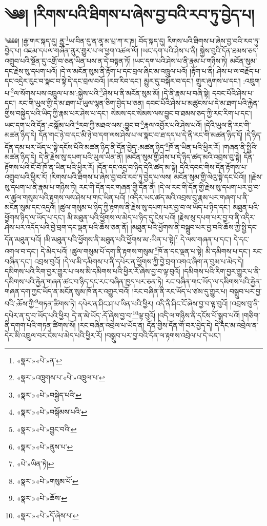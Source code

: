 \chapter{༄༅། །རིགས་པའི་ཐིགས་པ་ཞེས་བྱ་བའི་རབ་ཏུ་བྱེད་པ།}༄༅༅། །རྒྱ་གར་སྐད་དུ། ནྱཱ་\footnote{«སྣར་»«པེ་»ན་}ཡ་བིན་དུ་ན་ནཱ་མ་པྲ་ཀ་ར་ཎ། བོད་སྐད་དུ། རིགས་པའི་ཐིགས་པ་ཞེས་བྱ་བའི་རབ་ཏུ་བྱེད་པ། འཇམ་དཔལ་གཞོན་ནུར་གྱུར་པ་ལ་ཕྱག་འཚལ་ལོ། །ཡང་དག་པའི་ཤེས་པ་ནི། སྐྱེས་བུའི་དོན་ཐམས་ཅད་འགྲུབ་པའི་སྔོན་དུ་འགྲོ་བ་ཅན་ཡིན་པས་ན་དེ་བསྟན་ཏོ། །ཡང་དག་པའི་ཤེས་པ་ནི་རྣམ་པ་གཉིས་ཏེ། མངོན་སུམ་དང་རྗེས་སུ་དཔག་པའོ། །དེ་ལ་མངོན་སུམ་ནི་རྟོག་པ་དང་བྲལ་ཞིང་མ་འཁྲུལ་པའོ། །རྟོག་པ་ནི། ཤེས་པ་ལ་བརྗོད་པ་དང་འདྲེར་རུང་བ་སྣང་བ་སྟེ་དེ་དང་བྲལ་བའོ། །རབ་རིབ་དང་། མྱུར་དུ་བསྐོར་བ་དང་། གྲུར་ཞུགས་པ་དང་། :འཁྲུག་པ་\footnote{«སྣར་»འཁྲུགས་པ་«པེ་»འཁྲུལ་པ་}ལ་སོགས་པས་འཁྲུལ་པ་མ་:སྐྱེས་པའི་\footnote{«སྣར་»«པེ་»བསྐྱེད་པའི་}ཤེས་པ་ནི་མངོན་སུམ་མོ། །དེ་ནི་རྣམ་པ་བཞི་སྟེ། དབང་པོའི་ཤེས་པ་དང་། རང་གི་ཡུལ་གྱི་དེ་མ་ཐག་པ་ཡུལ་ལྷན་ཅིག་བྱེད་པ་ཅན། དབང་པོའི་ཤེས་པ་མཚུངས་པ་དེ་མ་ཐག་པའི་རྐྱེན་གྱིས་བསྐྱེད་པའི་ཡིད་ཀྱི་རྣམ་པར་ཤེས་པ་དང་། སེམས་དང་སེམས་ལས་བྱུང་བ་ཐམས་ཅད་ཀྱི་རང་རིག་པ་དང་། ཡང་དག་པའི་དོན་:བསྒོམ་པའི་\footnote{«སྣར་»«པེ་»བསྒོམས་པའི་}རབ་ཀྱི་མཐའ་ལས་:བྱུང་བ་\footnote{«སྣར་»«པེ་»བྱུང་བའི་}རྣལ་འབྱོར་པའི་ཤེས་པའོ། །དེའི་ཡུལ་ནི་རང་གི་མཚན་ཉིད་དེ། དོན་གང་ཉེ་བ་དང་མི་ཉེ་བ་དག་ལས་ཤེས་པ་ལ་སྣང་བ་ཐ་དད་པ་དེ་ནི་རང་གི་མཚན་ཉིད་དོ། །དེ་ཉིད་དོན་དམ་པར་ཡོད་པ་སྟེ་དངོས་པོའི་མཚན་ཉིད་ནི་དོན་བྱེད་:མཚན་ཉིད་\footnote{«སྣར་»«པེ་»ནུས་པ་}ཁོ་ན་ཡིན་པའི་ཕྱིར་རོ། །གཞན་ནི་སྤྱིའི་མཚན་ཉིད་དེ། དེ་ནི་རྗེས་སུ་དཔག་པའི་ཡུལ་ཡིན་ནོ། །མངོན་སུམ་གྱི་ཤེས་པ་དེ་ཉིད་ཚད་མའི་འབྲས་བུ་སྟེ། དོན་རྟོགས་པའི་ངོ་བོ་ཁོ་ན་ཡིན་པའི་ཕྱིར་རོ། །དོན་དང་འདྲ་བ་ཉིད་དེའི་ཚད་མ་སྟེ། དེའི་དབང་གིས་དོན་རྟོགས་པ་འགྲུབ་པའི་ཕྱིར་རོ། །རིགས་པའི་ཐིགས་པ་ཞེས་བྱ་བའི་རབ་ཏུ་བྱེད་པ་ལས། མངོན་སུམ་གྱི་ལེའུ་སྟེ་དང་པོའོ།། །།རྗེས་སུ་དཔག་པ་ནི་རྣམ་པ་གཉིས་ཏེ། རང་གི་དོན་དང་གཞན་གྱི་དོན་ནོ། །དེ་ལ་རང་གི་དོན་གྱི་རྗེས་སུ་དཔག་པར་བྱ་བ་ལ་ཚུལ་གསུམ་པའི་རྟགས་ལས་ཤེས་པ་གང་ཡིན་པའོ། །འདིར་ཡང་ཚད་མའི་འབྲས་བུ་རྣམ་པར་གཞག་པ་ནི་མངོན་སུམ་དང་འདྲའོ། །ཚུལ་གསུམ་པ་ཉིད་ཀྱི་རྟགས་ནི་རྗེས་སུ་དཔག་པར་བྱ་བ་ལ་ཡོད་པ་ཉིད་དང་། མཐུན་པའི་ཕྱོགས་ཉིད་ལ་ཡོད་པ་དང་། མི་མཐུན་པའི་ཕྱོགས་ལ་མེད་པ་ཉིད་དུ་ངེས་པའོ། །རྗེས་སུ་དཔག་པར་བྱ་བ་ནི་འདིར་ཤེས་པར་འདོད་པའི་བྱེ་བྲག་དང་ལྡན་པའི་ཆོས་ཅན་ནོ། །མཐུན་པའི་ཕྱོགས་ནི་བསྒྲུབ་པར་བྱ་བའི་ཆོས་ཀྱི་སྤྱི་དང་དོན་མཐུན་པའོ། །མི་མཐུན་པའི་ཕྱོགས་ནི་མཐུན་པའི་ཕྱོགས་མ་:ཡིན་པ་སྟེ།\footnote{«པེ་»ཡིན་ཏེ།} དེ་ལས་གཞན་པ་དང་། དེ་དང་འགལ་བ་དང་། དེ་མེད་པའོ། །ཚུལ་གསུམ་པོ་དག་ནི་རྟགས་གསུམ་\footnote{«སྣར་»«པེ་»གསུམ་པོ་}ཁོ་ན་དང་ལྡན་པ་སྟེ། མི་དམིགས་པ་དང་། རང་བཞིན་དང་། འབྲས་བུའོ། །དེ་ལ་མི་དམིགས་པ་ནི་དཔེར་ན་ཕྱོགས་ཀྱི་བྱེ་བྲག་འགའ་ཞིག་ན་བུམ་པ་མེད་དེ། དམིགས་པའི་རིག་བྱར་གྱུར་པ་ལས་མི་དམིགས་པའི་ཕྱིར་རོ་ཞེས་བྱ་བ་ལྟ་བུའོ། །དམིགས་པའི་རིག་བྱར་གྱུར་པ་ནི་དམིགས་པའི་རྐྱེན་གཞན་ཚང་བ་ཉིད་དང་རང་བཞིན་ཁྱད་པར་ཅན་ཏེ། རང་བཞིན་གང་ཡོད་ལ་དམིགས་པའི་རྐྱེན་གཞན་དག་ཀྱང་ཡོད་ན་མངོན་སུམ་ཁོ་ནར་འགྱུར་བའོ། །རང་བཞིན་ནི་རང་ཡོད་པ་ཙམ་དུ་གྱུར་པ། བསྒྲུབ་པར་བྱ་བའི་:ཆོས་ཀྱི་\footnote{«སྣར་»«པེ་»ཆོས་}གཏན་ཚིགས་ཏེ། དཔེར་ན་ཤིང་ཤ་པ་ཡིན་པའི་ཕྱིར། འདི་ནི་ཤིང་ངོ་ཞེས་བྱ་བ་ལྟ་བུའོ། །འབྲས་བུ་ནི་དཔེར་ན་དུ་བ་ཡོད་པའི་ཕྱིར། དེ་ན་མེ་ཡོད་:དོ་ཞེས་བྱ་བ་\footnote{«སྣར་»«པེ་»དོ་ཞེས་པ་}ལྟ་བུའོ། །འདི་ལ་གཉིས་ནི་དངོས་པོ་སྒྲུབ་པའོ། །གཅིག་ནི་དགག་པའི་གཏན་ཚིགས་སོ། །རང་བཞིན་འབྲེལ་པ་ཡོད་ན། དོན་གྱིས་དོན་གོ་བར་བྱེད་དེ། དེ་དང་མ་འབྲེལ་ན་དེར་མི་འཁྲུལ་བར་ངེས་པ་མེད་པའི་ཕྱིར་རོ། །བསྒྲུབ་པར་བྱ་བའི་དོན་ལ་རྟགས་འབྲེལ་པ་དེ་ཡང་། 